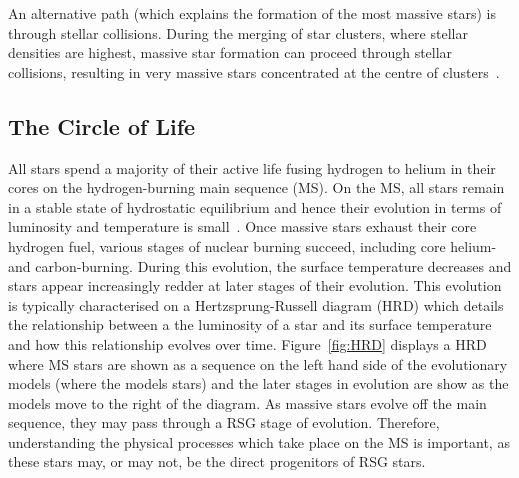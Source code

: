{An alternative path (which explains the formation of the most massive stars) is through stellar collisions.
During the merging of star clusters, where stellar densities are highest, massive star formation can proceed through stellar collisions, resulting in very massive stars concentrated at the centre of clusters~\citep{Fujii13}.



\subsection{The Circle of Life} %
\label{sub:life_cycle}

All stars spend a majority of their active life fusing hydrogen to helium in their cores on the hydrogen-burning main sequence (MS).
On the MS, all stars remain in a stable state of hydrostatic equilibrium and hence their evolution in terms of luminosity and temperature is small~\citep{2012sse..book.....K}.
Once massive stars exhaust their core hydrogen fuel, various stages of nuclear burning succeed, including core helium- and carbon-burning.
During this evolution, the surface temperature decreases and stars appear increasingly redder at later stages of their evolution.
This evolution is typically characterised on a Hertzsprung-Russell diagram (HRD) which details the relationship between a the luminosity of a star and its surface temperature and how this relationship evolves over time.
Figure~\ref{fig:HRD} displays a HRD where MS stars are shown as a sequence on the left hand side of the evolutionary models (where the models stars) and the later stages in evolution are show as the models move to the right of the diagram.
As massive stars evolve off the main sequence, they may pass through a RSG stage of evolution.
Therefore, understanding the physical processes which take place on the MS is important, as these stars may, or may not, be the direct progenitors of RSG stars.

}

